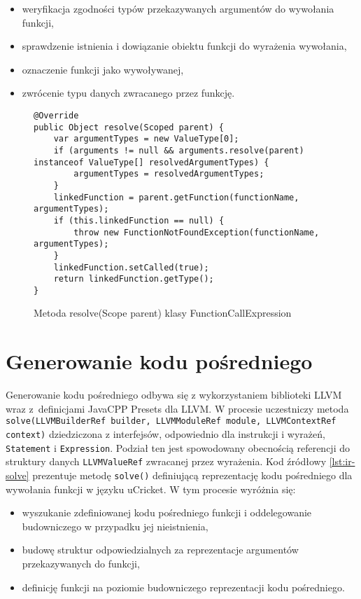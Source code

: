 \begin{itemize}
\item weryfikacja zgodności typów przekazywanych argumentów do wywołania funkcji,
\item sprawdzenie istnienia i dowiązanie obiektu funkcji do wyrażenia wywołania,
\item oznaczenie funkcji jako wywoływanej,
\item zwrócenie typu danych zwracanego przez funkcję.
\end{itemize}
\begin{figure}
\begin{lstlisting}
@Override
public Object resolve(Scoped parent) {
    var argumentTypes = new ValueType[0];
    if (arguments != null && arguments.resolve(parent) instanceof ValueType[] resolvedArgumentTypes) {
        argumentTypes = resolvedArgumentTypes;
    }
    linkedFunction = parent.getFunction(functionName, argumentTypes);
    if (this.linkedFunction == null) {
        throw new FunctionNotFoundException(functionName, argumentTypes);
    }
    linkedFunction.setCalled(true);
    return linkedFunction.getType();
}
\end{lstlisting}
\caption{Metoda resolve(Scope parent) klasy FunctionCallExpression} \label{lst:resolver-function-call}
\end{figure}


\section{Generowanie kodu pośredniego} 
Generowanie kodu pośredniego odbywa się z wykorzystaniem biblioteki LLVM wraz z~definicjami JavaCPP Presets dla LLVM. W procesie uczestniczy metoda \lstinline|solve(LLVMBuilderRef builder, LLVMModuleRef module, LLVMContextRef context)| dziedziczona z interfejsów, odpowiednio dla instrukcji i wyrażeń, \lstinline|Statement| i \lstinline|Expression|. Podział ten jest spowodowany obecnością referencji do struktury danych \lstinline|LLVMValueRef| zwracanej przez wyrażenia. Kod źródłowy \ref{lst:ir-solve} prezentuje metodę \lstinline|solve()| definiującą reprezentację kodu pośredniego dla wywołania funkcji w języku uCricket. W tym procesie wyróżnia się:
\begin{itemize}
\item wyszukanie zdefiniowanej kodu pośredniego funkcji i oddelegowanie budowniczego w przypadku jej nieistnienia,
\item budowę struktur odpowiedzialnych za reprezentacje argumentów przekazywanych do funkcji,
\item definicję funkcji na poziomie budowniczego reprezentacji kodu pośredniego.
\end{itemize}

